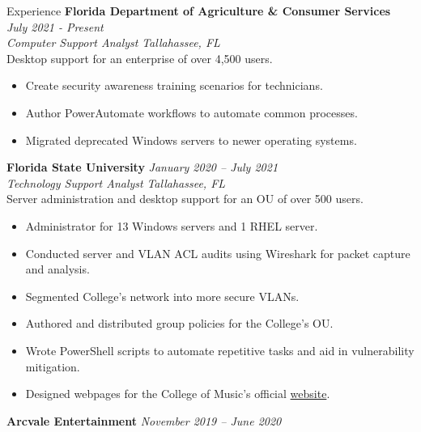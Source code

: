 \documentclass{resume} %
\begin{document}
	\begin{rSection}{Experience}
		{\bf Florida Department of Agriculture \& Consumer Services} \hfill {\em July 2021 - Present}\\
		\textit{Computer Support Analyst} \hfill {\em Tallahassee, FL} \\
		Desktop support for an enterprise of over 4,500 users.
		\begin{itemize}
			\vspace{-0.2cm} \item Create security awareness training scenarios for technicians.
			\vspace{-0.2cm} \item Author PowerAutomate workflows to automate common processes.
			\vspace{-0.2cm} \item Migrated deprecated Windows servers to newer operating systems.
		\end{itemize}
		{\bf Florida State University} \hfill {\em January 2020 – July 2021} \\
		\textit{Technology Support Analyst} \hfill {\em Tallahassee, FL} \smallskip \\
		Server administration and desktop support for an OU of over 500 users.
		\begin{itemize}
			\vspace{-0.2cm} \item Administrator for 13 Windows servers and 1 RHEL server.
			\vspace{-0.2cm} \item Conducted server and VLAN ACL audits using Wireshark for packet capture and analysis.
			\vspace{-0.2cm} \item Segmented College's network into more secure VLANs.\vspace{-0.2cm} \item Authored and distributed group policies for the College's OU.
			\vspace{-0.2cm} \item Wrote PowerShell scripts to automate repetitive tasks and aid in vulnerability mitigation.\vspace{-0.2cm} \item Designed webpages for the College of Music's official {\color{cyan} \href{https://music.fsu.edu/ensembles/orchestras/audition-information-orchestras}{website}}.
		\end{itemize}
		{\bf Arcvale Entertainment} \hfill {\em November 2019 – June 2020}\\

\end{rSection}
\end{document}

